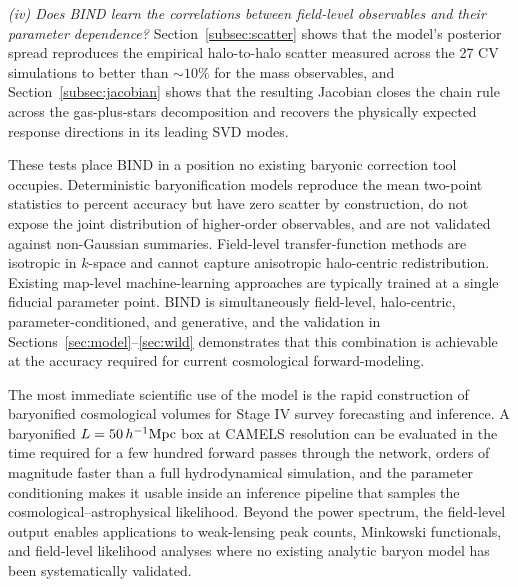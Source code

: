 \documentclass[linenumbers,trackchanges, twocolumn]{aastex701}
\begin{document}
\emph{(iv) Does BIND learn the correlations between field-level observables and their parameter dependence?} Section~\ref{subsec:scatter} shows that the model's posterior spread reproduces the empirical halo-to-halo scatter measured across the 27 CV simulations to better than $\sim\!10\%$ for the mass observables, and Section~\ref{subsec:jacobian} shows that the resulting Jacobian closes the chain rule across the gas-plus-stars decomposition and recovers the physically expected response directions in its leading SVD modes.

These tests place \textsc{BIND} in a position no existing baryonic correction tool occupies. Deterministic baryonification models reproduce the mean two-point statistics to percent accuracy but have zero scatter by construction, do not expose the joint distribution of higher-order observables, and are not validated against non-Gaussian summaries. Field-level transfer-function methods are isotropic in $k$-space and cannot capture anisotropic halo-centric redistribution. Existing map-level machine-learning approaches are typically trained at a single fiducial parameter point. \textsc{BIND} is simultaneously field-level, halo-centric, parameter-conditioned, and generative, and the validation in Sections~\ref{sec:model}--\ref{sec:wild} demonstrates that this combination is achievable at the accuracy required for current cosmological forward-modeling.

The most immediate scientific use of the model is the rapid construction of baryonified cosmological volumes for Stage IV survey forecasting and inference. A baryonified $L=50\,h^{-1}{\rm Mpc}$ box at CAMELS resolution can be evaluated in the time required for a few hundred forward passes through the network, orders of magnitude faster than a full hydrodynamical simulation, and the parameter conditioning makes it usable inside an inference pipeline that samples the cosmological--astrophysical likelihood. Beyond the power spectrum, the field-level output enables applications to weak-lensing peak counts, Minkowski functionals, and field-level likelihood analyses where no existing analytic baryon model has been systematically validated.
\end{document}
